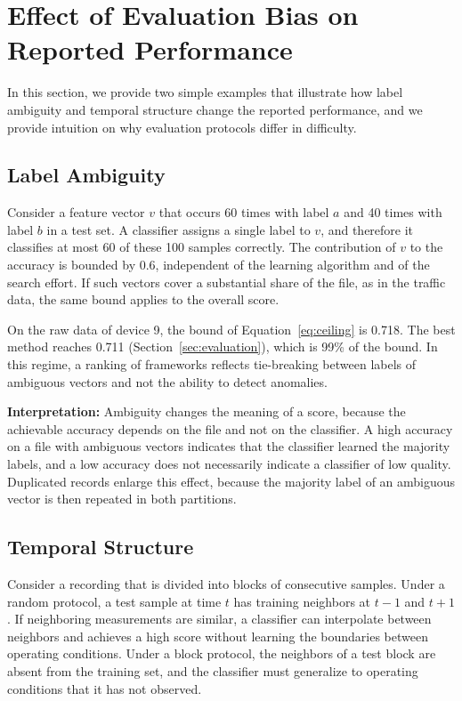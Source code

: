 \section{Effect of Evaluation Bias on Reported Performance}\label{sec:effect}
In this section, we provide two simple examples that illustrate how label ambiguity and temporal structure change the reported performance, and we provide intuition on why evaluation protocols differ in difficulty.

\subsection{Label Ambiguity}
Consider a feature vector $v$ that occurs 60 times with label $a$ and 40 times with label $b$ in a test set. A classifier assigns a single label to $v$, and therefore it classifies at most 60 of these 100 samples correctly. The contribution of $v$ to the accuracy is bounded by 0.6, independent of the learning algorithm and of the search effort. If such vectors cover a substantial share of the file, as in the traffic data, the same bound applies to the overall score.

On the raw data of device 9, the bound of Equation~\eqref{eq:ceiling} is 0.718. The best method reaches 0.711 (Section~\ref{sec:evaluation}), which is 99\% of the bound. In this regime, a ranking of frameworks reflects tie-breaking between labels of ambiguous vectors and not the ability to detect anomalies.

\textbf{Interpretation:} Ambiguity changes the meaning of a score, because the achievable accuracy depends on the file and not on the classifier. A high accuracy on a file with ambiguous vectors indicates that the classifier learned the majority labels, and a low accuracy does not necessarily indicate a classifier of low quality. Duplicated records enlarge this effect, because the majority label of an ambiguous vector is then repeated in both partitions.

\subsection{Temporal Structure}
Consider a recording that is divided into blocks of consecutive samples. Under a random protocol, a test sample at time $t$ has training neighbors at $t-1$ and $t+1$. If neighboring measurements are similar, a classifier can interpolate between neighbors and achieves a high score without learning the boundaries between operating conditions. Under a block protocol, the neighbors of a test block are absent from the training set, and the classifier must generalize to operating conditions that it has not observed.

